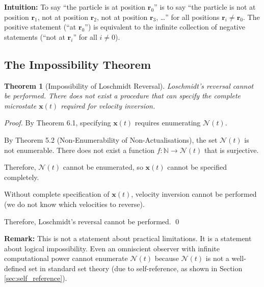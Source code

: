 \documentclass[twocolumn,10pt]{article}
\newtheorem{theorem}{Theorem}[section]
\theoremstyle{definition}
\theoremstyle{remark}
\begin{document}
\textbf{Intuition:} To say ``the particle is at position $\mathbf{r}_0$'' is to say ``the particle is not at position $\mathbf{r}_1$, not at position $\mathbf{r}_2$, not at position $\mathbf{r}_3$, \ldots'' for all positions $\mathbf{r}_i \neq \mathbf{r}_0$. The positive statement (``at $\mathbf{r}_0$'') is equivalent to the infinite collection of negative statements (``not at $\mathbf{r}_i$'' for all $i \neq 0$).

\subsection{The Impossibility Theorem}

\begin{theorem}[Impossibility of Loschmidt Reversal]
Loschmidt's reversal cannot be performed. There does not exist a procedure that can specify the complete microstate $\mathbf{x}(t)$ required for velocity inversion.
\end{theorem}

\begin{proof}
By Theorem 6.1, specifying $\mathbf{x}(t)$ requires enumerating $\mathcal{N}(t)$.

By Theorem 5.2 (Non-Enumerability of Non-Actualisations), the set $\mathcal{N}(t)$ is not enumerable. There does not exist a function $f : \mathbb{N} \to \mathcal{N}(t)$ that is surjective.

Therefore, $\mathcal{N}(t)$ cannot be enumerated, so $\mathbf{x}(t)$ cannot be specified completely.

Without complete specification of $\mathbf{x}(t)$, velocity inversion cannot be performed (we do not know which velocities to reverse).

Therefore, Loschmidt's reversal cannot be performed. \qed
\end{proof}

\textbf{Remark:} This is not a statement about practical limitations. It is a statement about logical impossibility. Even an omniscient observer with infinite computational power cannot enumerate $\mathcal{N}(t)$ because $\mathcal{N}(t)$ is not a well-defined set in standard set theory (due to self-reference, as shown in Section \ref{sec:self_reference}).
\end{document}
